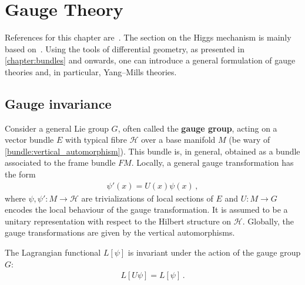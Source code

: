 \chapter{Gauge Theory}\label{chapter:gauge_theory}

    References for this chapter are~\citet{sontz_principal_2015,schuller_lectures_2016,nash_topology_2011,belgun_gauge_2024}. The section on the Higgs mechanism is mainly based on~\citet{choquet-bruhat_analysis_2000}. Using the tools of differential geometry, as presented in \cref{chapter:bundles} and onwards, one can introduce a general formulation of gauge theories and, in particular, Yang--Mills theories.

    \minitoc

\section{Gauge invariance}

    Consider a general Lie group $G$, often called the \textbf{gauge group}, acting on a vector bundle $E$ with typical fibre $\mathcal{H}$ over a base manifold $M$ (be wary of \cref{bundle:vertical_automorphism}). This bundle is, in general, obtained as a bundle associated to the frame bundle $FM$. Locally, a general gauge transformation has the form
    \begin{gather}
        \label{gauge:gauge_transformation}
        \psi'(x) = U(x)\psi(x)\,,
    \end{gather}
    where $\psi,\psi':M\rightarrow\mathcal{H}$ are trivializations of local sections of $E$ and $U:M\rightarrow G$ encodes the local behaviour of the gauge transformation. It is assumed to be a unitary representation with respect to the Hilbert structure on $\mathcal{H}$. Globally, the gauge transformations are given by the vertical automorphisms.

    \begin{axiom}
        The Lagrangian functional $L[\psi]$ is invariant under the action of the gauge group $G$:
        \begin{gather}
            L[U\psi] = L[\psi]\,.
        \end{gather}
    \end{axiom}

